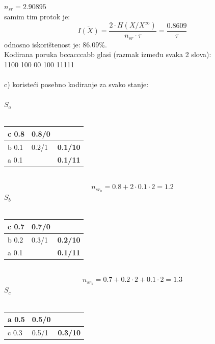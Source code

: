 \documentclass[12pt]{article}
\begin{document}
\begin{enumerate}
$n_{sr} = 2.90895$
\\
samim tim protok je: 
\begin{equation*}
    \overline{I(X)} = \frac{2 \cdot H(X/X^\infty)}{n_{sr} \cdot \tau} = \frac{0.8609}{\tau}
\end{equation*}
odnosno iskorištenost je: 86.09\%. \\
Kodirana poruka bccacccabb glasi (razmak između svaka 2 slova): \\
1100 100 00 100 11111
\\
\\
c) koristeći posebno kodiranje za svako stanje:
\\
\\
$S_a$ \\
\\
\begin{tabular}{|l|l|l}
\cline{1-2}
c 0.8 & \textbf{0.8/0} &                                      \\ \hline
b 0.1 & 0.2/1          & \multicolumn{1}{l|}{\textbf{0.1/10}} \\ \cline{1-1} \cline{3-3} 
a 0.1 &                & \multicolumn{1}{l|}{\textbf{0.1/11}} \\ \hline
\end{tabular}
\\
\begin{equation*}
    n_{sr_{a}} = 0.8 + 2\cdot0.1\cdot2 = 1.2
\end{equation*}
 $S_b$ \\
\\
\begin{tabular}{|l|l|l}
\cline{1-2}
c 0.7 & \textbf{0.7/0} &                                      \\ \hline
b 0.2 & 0.3/1          & \multicolumn{1}{l|}{\textbf{0.2/10}} \\ \cline{1-1} \cline{3-3} 
a 0.1 &                & \multicolumn{1}{l|}{\textbf{0.1/11}} \\ \hline
\end{tabular}
\\
\begin{equation*}
    n_{sr_{b}} = 0.7 + 0.2\cdot2 + 0.1\cdot2 = 1.3
\end{equation*}
 $S_c$ \\
\\
\begin{tabular}{|l|l|l}
\cline{1-2}
a 0.5 & \textbf{0.5/0} &                                      \\ \hline
c 0.3 & 0.5/1          & \multicolumn{1}{l|}{\textbf{0.3/10}} \\ \cline{1-1} \cline{3-3} 

\end{tabular}
\end{enumerate}
\end{document}
